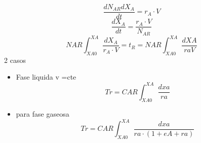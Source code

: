 \documentclass{report}
\begin{document}
\begin{raggedright}
\begin{equation}
\end{equation}
\begin{equation}
	\frac{dN_{AR}dX_A}{dt} = r_A \cdot V
\end{equation}
\begin{equation}
	\frac{dX_A}{dt} = \frac{r_A \cdot V}{N_{AR}}
\end{equation}
\begin{equation}
	NAR \int_{XA0}^{XA} \frac{dX_A}{r_A \cdot V} = t_R = NAR \int_{XA0}^{XA} \frac{dXA}{ra V}
\end{equation}
2 casos 
\begin{itemize}
	\item Fase liquida v =cte 
	\begin{equation}
		Tr = CAR \int_{XA0}^{XA} \frac{dxa}{ra}
	\end{equation}
	\item para fase gaseosa 
	\begin{equation}
		Tr = CAR \int_{XA0}^{XA} \frac{dxa}{ra \cdot (1 + eA + ra)}
	\end{equation}
	\end{itemize}
\end{raggedright}
\end{document}
